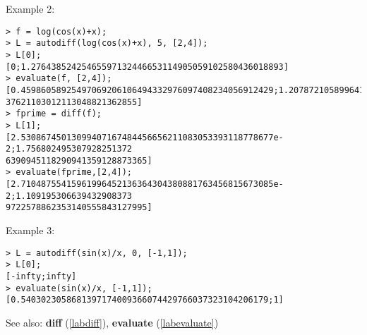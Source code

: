 \noindent Example 2: 
\begin{center}\begin{minipage}{15cm}\begin{Verbatim}[frame=single]
> f = log(cos(x)+x);
> L = autodiff(log(cos(x)+x), 5, [2,4]);
> L[0];
[0;1.27643852425465597132446653114905059102580436018893]
> evaluate(f, [2,4]);
[0.45986058925497069206106494332976097408234056912429;1.207872105899641695959010
37621103012113048821362855]
> fprime = diff(f);
> L[1];
[2.53086745013099407167484456656211083053393118778677e-2;1.756802495307928251372
6390945118290941359128873365]
> evaluate(fprime,[2,4]);
[2.71048755415961996452136364304380881763456815673085e-2;1.109195306639432908373
9722578862353140555843127995]
\end{Verbatim}
\end{minipage}\end{center}
\noindent Example 3: 
\begin{center}\begin{minipage}{15cm}\begin{Verbatim}[frame=single]
> L = autodiff(sin(x)/x, 0, [-1,1]);
> L[0];
[-infty;infty]
> evaluate(sin(x)/x, [-1,1]);
[0.5403023058681397174009366074429766037323104206179;1]
\end{Verbatim}
\end{minipage}\end{center}
See also: \textbf{diff} (\ref{labdiff}), \textbf{evaluate} (\ref{labevaluate})
